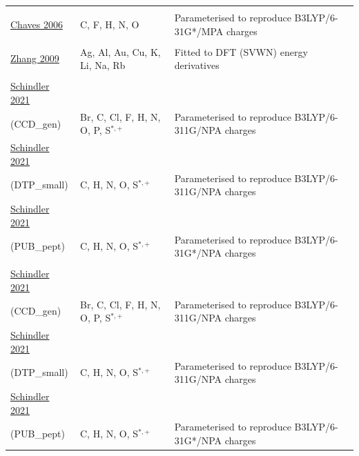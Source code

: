 \documentclass[oneside]{memoir}
\begin{document}
\begin{longtable}{p{4cm} p{3.3cm} p{8cm}}
\addlinespace
\hline\hline
\addlinespace[5pt]\multicolumn{3}{l}{\textbf{SFKEEM}} \\\addlinespace[5pt]
\addlinespace[5pt] \href{https://doi.org/10.1021/ci050505e}{Chaves 2006} & C, F, H, N, O & Parameterised to reproduce B3LYP/6-31G*/MPA charges \\
\addlinespace
\hline\hline
\addlinespace[5pt]\multicolumn{3}{l}{\textbf{SMP/QEq}} \\\addlinespace[5pt]
\addlinespace[5pt] \href{https://doi.org/10.1021/jp8063273}{Zhang 2009} & Ag, Al, Au, Cu, K, Li, Na, Rb & Fitted to DFT (SVWN) energy derivatives \\
\addlinespace
\hline\hline
\addlinespace[5pt]\multicolumn{3}{l}{\textbf{SQE}} \\\addlinespace[5pt]
\addlinespace[5pt] \href{https://doi.org/10.1186/s13321-021-00528-w}{Schindler 2021}\\(CCD\_gen) & Br, C, Cl, F, H, N, O, P, S$^{*,+}$ & Parameterised to reproduce B3LYP/6-311G/NPA charges \\
\addlinespace[5pt]\midrule\addlinespace[5pt] \href{https://doi.org/10.1186/s13321-021-00528-w}{Schindler 2021}\\(DTP\_small) & C, H, N, O, S$^{*,+}$ & Parameterised to reproduce B3LYP/6-311G/NPA charges \\
\addlinespace[5pt]\midrule\addlinespace[5pt] \href{https://doi.org/10.1186/s13321-021-00528-w}{Schindler 2021}\\(PUB\_pept) & C, H, N, O, S$^{*,+}$ & Parameterised to reproduce B3LYP/6-31G*/NPA charges \\
\addlinespace
\hline\hline
\addlinespace[5pt]\multicolumn{3}{l}{\textbf{SQE+q0}} \\\addlinespace[5pt]
\addlinespace[5pt] \href{https://doi.org/10.1186/s13321-021-00528-w}{Schindler 2021}\\(CCD\_gen) & Br, C, Cl, F, H, N, O, P, S$^{*,+}$ & Parameterised to reproduce B3LYP/6-311G/NPA charges \\
\pagebreak
\addlinespace[5pt] \href{https://doi.org/10.1186/s13321-021-00528-w}{Schindler 2021}\\(DTP\_small) & C, H, N, O, S$^{*,+}$ & Parameterised to reproduce B3LYP/6-311G/NPA charges \\
\addlinespace[5pt]\midrule\addlinespace[5pt] \href{https://doi.org/10.1186/s13321-021-00528-w}{Schindler 2021}\\(PUB\_pept) & C, H, N, O, S$^{*,+}$ & Parameterised to reproduce B3LYP/6-31G*/NPA charges \\

\end{longtable}
\end{document}
